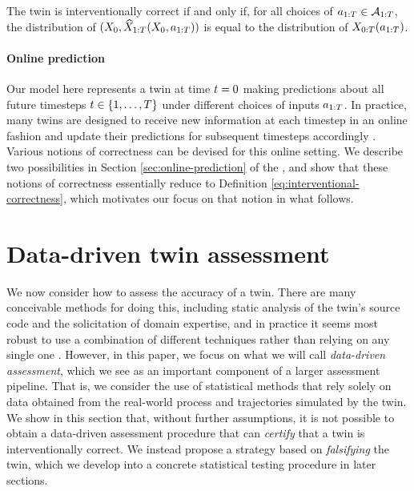 %
%
%
%
%
%
%
%
%
%
%
%

\begin{proposition} \label{prop:interventional-correctness-alternative-characterisation}
    The twin is interventionally correct if and only if, for all choices of $a_{1:T} \in \mathcal{A}_{1:T}$, the distribution of $(X_0, \widehat{X}_{1:T}(X_0, a_{1:T}))$ is equal to the distribution of $X_{0:T}(a_{1:T})$.
\end{proposition}


%
%
%
%
%
%

%
%
%

\paragraph{Online prediction}

Our model here represents a twin at time $t = 0$ making predictions about all future timesteps $t \in \{1, \ldots, T\}$ under different choices of inputs $a_{1:T}$.
In practice, many twins are designed to receive new information at each timestep in an online fashion and update their predictions for subsequent timesteps accordingly \cite{grieves2017digital,niederer2021scaling}.
%
Various notions of correctness can be devised for this online setting.
We describe two possibilities in Section \ref{sec:online-prediction} of the \AppendixName, and show that these notions of correctness essentially reduce to Definition \ref{eq:interventional-correctness}, which motivates our focus on that notion in what follows.
%
%

\section{Data-driven twin assessment} \label{sec:data-driven-twin-assessment}

We now consider how to assess the accuracy of a twin.
There are many conceivable methods for doing this, including static analysis of the twin's source code and the solicitation of domain expertise, and in practice it seems most robust to use a combination of different techniques rather than relying on any single one \cite{amse2018assessing,niederer2021scaling,galappaththige2022credibility}.
However, in this paper, we focus on what we will call \emph{data-driven assessment}, which we see as an important component of a larger assessment pipeline. %
That is, we consider the use of statistical methods that rely solely on data obtained from the real-world process and trajectories simulated by the twin.
%
%
%
%
%
%
%
%
We show in this section that, without further assumptions, it is not possible to obtain a data-driven assessment procedure that can \emph{certify} that a twin is interventionally correct.
%
We instead propose a strategy based on \emph{falsifying} the twin, which we develop into a concrete statistical testing procedure in later sections.

